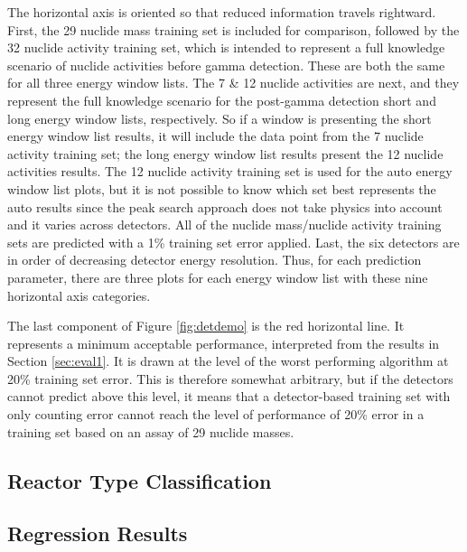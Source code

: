 The horizontal axis is oriented so that reduced information travels rightward.
First, the 29 nuclide mass training set is included for comparison, followed by
the 32 nuclide activity training set, which is intended to represent a full
knowledge scenario of nuclide activities before gamma detection. These are both
the same for all three energy window lists.  The 7 \& 12 nuclide activities are
next, and they represent the full knowledge scenario for the post-gamma
detection short and long energy window lists, respectively.  So if a window is
presenting the short energy window list results, it will include the data point
from the 7 nuclide activity training set; the long energy window list results
present the 12 nuclide activities results. The 12 nuclide activity training set
is used for the auto energy window list plots, but it is not possible to know
which set best represents the auto results since the peak search approach does
not take physics into account and it varies across detectors. All of the
nuclide mass/nuclide activity training sets are predicted with a 1\% training
set error applied.  Last, the six detectors are in order of decreasing detector
energy resolution. Thus, for each prediction parameter, there are three plots
for each energy window list with these nine horizontal axis categories. 

The last component of Figure \ref{fig:detdemo} is the red horizontal line.  It
represents a minimum acceptable performance, interpreted from the results in
Section \ref{sec:eval1}. It is drawn at the level of the worst performing
algorithm at 20\% training set error.  This is therefore somewhat arbitrary,
but if the detectors cannot predict above this level, it means that a
detector-based training set with only counting error cannot reach the level of
performance of 20\% error in a training set based on an assay of 29 nuclide
masses.

\subsection{Reactor Type Classification}

\label{sec:exp2_rxtr}

\subsection{Regression Results}

\label{sec:exp2_reg}

